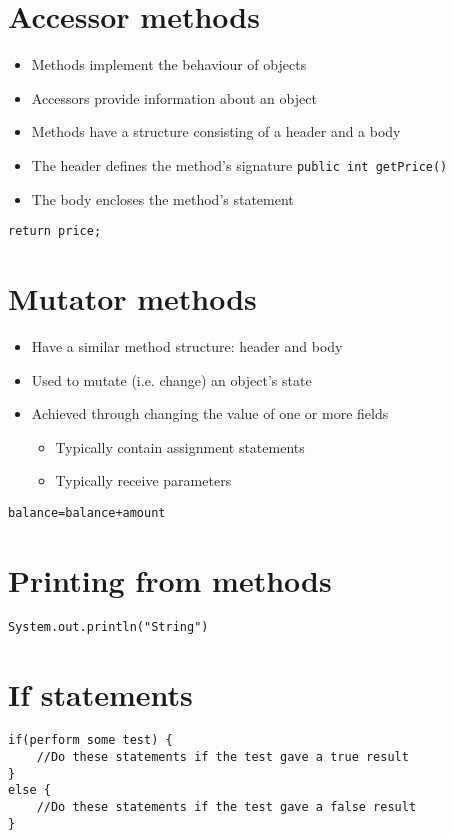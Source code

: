 \documentclass{article}[18pt]
\begin{document}
\section{Accessor methods}
\begin{itemize}
	\item Methods implement the behaviour of objects
	\item Accessors provide information about an object
	\item Methods have a structure consisting of a header and a body
	\item The header defines the method's signature \texttt{public int getPrice()}
	\item The body encloses the method's statement
\end{itemize}
\begin{verbatim}
return price;
\end{verbatim}
\section{Mutator methods}
\begin{itemize}
	\item Have a similar method structure: header and body
	\item Used to mutate (i.e. change) an object's state
	\item Achieved through changing the value of one or more fields
	\begin{itemize}
		\item Typically contain assignment statements
		\item Typically receive parameters
	\end{itemize}
\end{itemize}
\begin{verbatim}
balance=balance+amount
\end{verbatim}
\section{Printing from methods}
\begin{verbatim}
System.out.println("String")
\end{verbatim}
\section{If statements}
\begin{verbatim}
if(perform some test) {
	//Do these statements if the test gave a true result
}
else {
	//Do these statements if the test gave a false result
}
\end{verbatim}
\end{document}
